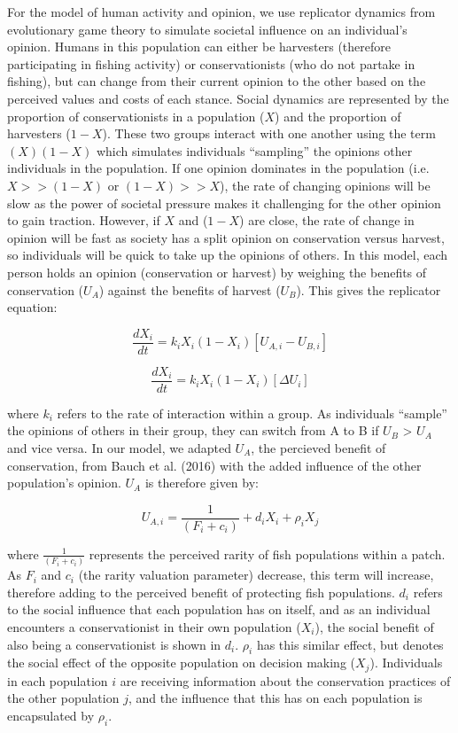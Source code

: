 \documentclass[
  12pt,
]{article}
\begin{document}
For the model of human activity and opinion, we use replicator dynamics from evolutionary game theory to simulate societal influence on an individual's opinion. Humans in this population can either be harvesters (therefore participating in fishing activity) or conservationists (who do not partake in fishing), but can change from their current opinion to the other based on the perceived values and costs of each stance. Social dynamics are represented by the proportion of conservationists in a population (\(X\)) and the proportion of harvesters (\(1-X\)). These two groups interact with one another using the term \((X)(1-X)\) which simulates individuals ``sampling'' the opinions other individuals in the population. If one opinion dominates in the population (i.e.~\(X >> (1-X)\) or \((1-X) >> X\)), the rate of changing opinions will be slow as the power of societal pressure makes it challenging for the other opinion to gain traction. However, if \(X\) and (\(1-X\)) are close, the rate of change in opinion will be fast as society has a split opinion on conservation versus harvest, so individuals will be quick to take up the opinions of others. In this model, each person holds an opinion (conservation or harvest) by weighing the benefits of conservation (\(U_A\)) against the benefits of harvest (\(U_B\)). This gives the replicator equation:

\begin{equation} 
\frac{dX_i}{dt} = k_iX_i(1-X_i)[U_{A,i} - U_{B,i}]
  \label{eq:rep1}
\end{equation}

\begin{equation} 
\frac{dX_i}{dt} = k_iX_i(1-X_i)[\Delta U_i]
  \label{eq:rep2}
\end{equation}

where \(k_i\) refers to the rate of interaction within a group. As individuals ``sample'' the opinions of others in their group, they can switch from A to B if \(U_B\) \textgreater{} \(U_A\) and vice versa. In our model, we adapted \(U_A\), the percieved benefit of conservation, from Bauch et al. (2016) with the added influence of the other population's opinion. \(U_A\) is therefore given by:

\begin{equation} 
U_{A,i} = \frac{1}{(F_i + c_i)} + d_iX_i + \rho_i X_j
  \label{eq:pros1}
\end{equation}

where \(\frac{1}{(F_i + c_i)}\) represents the perceived rarity of fish populations within a patch. As \(F_i\) and \(c_i\) (the rarity valuation parameter) decrease, this term will increase, therefore adding to the perceived benefit of protecting fish populations. \(d_i\) refers to the social influence that each population has on itself, and as an individual encounters a conservationist in their own population (\(X_i\)), the social benefit of also being a conservationist is shown in \(d_i\). \(\rho_i\) has this similar effect, but denotes the social effect of the opposite population on decision making (\(X_j\)). Individuals in each population \(i\) are receiving information about the conservation practices of the other population \(j\), and the influence that this has on each population is encapsulated by \(\rho_i\).
\end{document}
